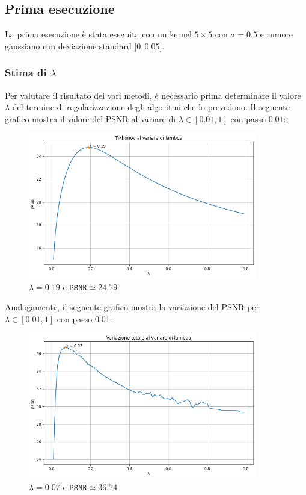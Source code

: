\documentclass[11pt]{article}
\begin{document}
\subsection*{Prima esecuzione}
La prima esecuzione è stata eseguita con un kernel $5 \times 5$ con $\sigma=0.5$ e rumore gaussiano con deviazione standard $]0, 0.05]$.

\subsubsection*{Stima di $\lambda$}
Per valutare il risultato dei vari metodi, è necessario prima determinare il valore $\lambda$ del termine di regolarizzazione degli algoritmi che lo prevedono.
Il seguente grafico mostra il valore del PSNR al variare di $\lambda \in [0.01, 1]$ con passo $0.01$:
\begin{figure}[H]
    \centering
    \includegraphics[width=10cm]{esecuzione/1/tikhonov_lambda.png}
    \caption{$\lambda=0.19$ e $\texttt{PSNR} \simeq 24.79$}
    \label{fig:tikhonov_lambda1}
\end{figure}
Analogamente, il seguente grafico mostra la variazione del PSNR per $\lambda \in [0.01, 1]$ con passo $0.01$:
\begin{figure}[H]
    \centering
    \includegraphics[width=10cm]{esecuzione/1/tv_lambda.png}
    \caption{$\lambda=0.07$ e $\texttt{PSNR} \simeq 36.74$}
    \label{fig:tv_lambda1}
\end{figure}
\end{document}
